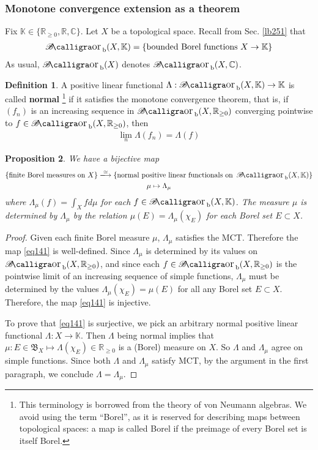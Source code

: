 \documentclass[12pt,b5paper,notitlepage]{article}
\theoremstyle{definition}
\newtheorem{df}{Definition}[subsection]
\theoremstyle{plain}
\newtheorem{pp}[df]{Proposition}
\DeclareMathOperator{\Borb}{{\mathscr{B}\text{\kern -2pt {\calligra\large or}}\,}_{\mathrm b}}
\newcommand{\fk}{\mathfrak}
\newcommand{\Kbb}{\mathbb K}
\newcommand{\Cbb}{\mathbb C}
\newcommand{\Rbb}{\mathbb R}
\numberwithin{equation}{section}
\begin{document}
\subsubsection{Monotone convergence extension as a theorem}

Fix $\Kbb\in\{\Rbb_{\geq0},\Rbb,\Cbb\}$. Let $X$ be a topological space. Recall from Sec. \ref{lb251} that
\begin{align}
\Borb(X,\Kbb)=\{\text{bounded Borel functions }X\rightarrow\Kbb\}
\end{align}
As usual, $\Borb(X)$ denotes $\Borb(X,\Cbb)$.


\begin{df}\label{lb273}
A positive linear functional $\Lambda:\Borb(X,\Kbb)\rightarrow\Kbb$ is called \textbf{normal} \footnote{This terminology is borrowed from the theory of von Neumann algebras. We avoid using the term ``Borel'', as it is reserved for describing maps between topological spaces: a map is called Borel if the preimage of every Borel set is itself Borel.}  if it satisfies the monotone convergence theorem, that is, if $(f_n)$ is an increasing sequence in $\Borb(X,\Rbb_{\geq0})$ converging pointwise to $f\in\Borb(X,\Rbb_{\geq0})$, then
\begin{align*}
\lim_n\Lambda(f_n)=\Lambda(f)
\end{align*}
\end{df}


\begin{pp}\label{lb252}
We have a bijective map
\begin{gather}\label{eq141}
\begin{gathered}
\{\text{finite Borel measures on $X$}\}\xlongrightarrow{\simeq}\{\text{normal positive linear functionals on }\Borb(X,\Kbb)\}\\
\mu\mapsto\Lambda_\mu
\end{gathered}
\end{gather}
where $\Lambda_\mu(f)=\int_Xfd\mu$ for each $f\in\Borb(X,\Kbb)$. The measure $\mu$ is determined by $\Lambda_\mu$ by the relation $\mu(E)=\Lambda_\mu(\chi_E)$ for each Borel set $E\subset X$.
\end{pp}

\begin{proof}
Given each finite Borel measure $\mu$, $\Lambda_\mu$ satisfies the MCT. Therefore the map \eqref{eq141} is well-defined. Since $\Lambda_\mu$ is determined by its values on $\Borb(X,\Rbb_{\geq0})$, and since each $f\in\Borb(X,\Rbb_{\geq0})$ is the pointwise limit of an increasing sequence of simple functions, $\Lambda_\mu$ must be determined by the values $\Lambda_\mu(\chi_E)=\mu(E)$ for all any Borel set $E\subset X$. Therefore, the map \eqref{eq141} is injective.

To prove that \eqref{eq141} is surjective, we pick an arbitrary normal positive linear functional $\Lambda:X\rightarrow\Kbb$. Then $\Lambda$ being normal implies that $\mu:E\in\fk B_X\mapsto \Lambda(\chi_E)\in\Rbb_{\geq0}$ is a (Borel) measure on $X$. So $\Lambda$ and $\Lambda_\mu$ agree on simple functions. Since both $\Lambda$ and $\Lambda_\mu$ satisfy MCT, by the argument in the first paragraph, we conclude $\Lambda=\Lambda_\mu$.
\end{proof}
\end{document}
